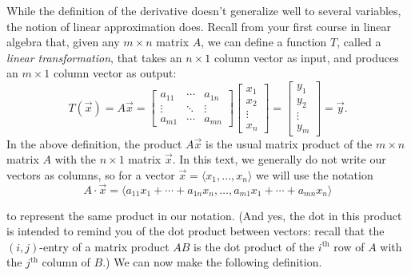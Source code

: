 While the definition of the derivative doesn't generalize well to several variables, the notion of linear approximation does. Recall from your first course in linear algebra that, given any $m\times n$ matrix $A$, we can define a function $T$, called a \emph{linear transformation}, that takes an $n\times 1$ column vector as input, and produces an $m\times 1$ column vector as output:
\[
T(\vec{x}) = A\vec{x} = 
	\begin{bmatrix} 
		a_{11} & \cdots & a_{1n}\\
		\vdots & \ddots & \vdots \\
		a_{m1} & \cdots & a_{mn}
	\end{bmatrix}
	\begin{bmatrix}x_1\\x_2\\ \vdots\\x_n\end{bmatrix}
	 = \begin{bmatrix}y_1\\y_2\\ \vdots \\y_m\end{bmatrix}=\vec{y}.
\]
In the above definition, the product $A\vec{x}$ is the usual matrix product of the $m\times n$ matrix $A$ with the $n\times 1$ matrix $\vec{x}$. In this text, we generally do not write our vectors as columns, so for a vector $\vec{x}=\langle x_1,\ldots, x_n\rangle$ we will use the notation
\[
A\cdot \vec{x} =\langle a_{11}x_1+\cdots + a_{1n}x_n, \ldots, a_{m1}x_1+\cdots +a_{mn}x_n\rangle
\]

to represent the same product in our notation. (And yes, the dot in this product is intended to remind you of the dot product between vectors: recall that the $(i,j)$-entry of a matrix product $AB$ is the dot product of the $i^{\text{th}}$ row of $A$ with the $j^{\text{th}}$ column of $B$.) We can now make the following definition.


\\

